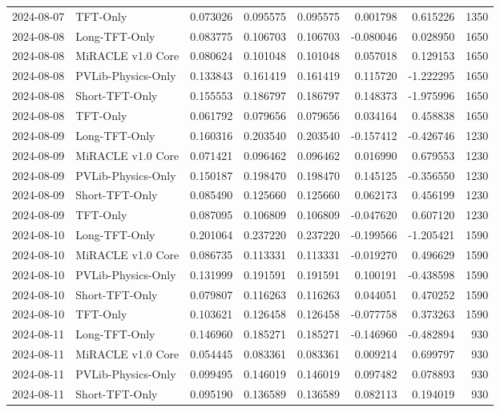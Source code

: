 \begin{tabular}{llrrrrrr}
2024-08-07 & TFT-Only & 0.073026 & 0.095575 & 0.095575 & 0.001798 & 0.615226 & 1350 \\
2024-08-08 & Long-TFT-Only & 0.083775 & 0.106703 & 0.106703 & -0.080046 & 0.028950 & 1650 \\
2024-08-08 & MiRACLE v1.0 Core & 0.080624 & 0.101048 & 0.101048 & 0.057018 & 0.129153 & 1650 \\
2024-08-08 & PVLib-Physics-Only & 0.133843 & 0.161419 & 0.161419 & 0.115720 & -1.222295 & 1650 \\
2024-08-08 & Short-TFT-Only & 0.155553 & 0.186797 & 0.186797 & 0.148373 & -1.975996 & 1650 \\
2024-08-08 & TFT-Only & 0.061792 & 0.079656 & 0.079656 & 0.034164 & 0.458838 & 1650 \\
2024-08-09 & Long-TFT-Only & 0.160316 & 0.203540 & 0.203540 & -0.157412 & -0.426746 & 1230 \\
2024-08-09 & MiRACLE v1.0 Core & 0.071421 & 0.096462 & 0.096462 & 0.016990 & 0.679553 & 1230 \\
2024-08-09 & PVLib-Physics-Only & 0.150187 & 0.198470 & 0.198470 & 0.145125 & -0.356550 & 1230 \\
2024-08-09 & Short-TFT-Only & 0.085490 & 0.125660 & 0.125660 & 0.062173 & 0.456199 & 1230 \\
2024-08-09 & TFT-Only & 0.087095 & 0.106809 & 0.106809 & -0.047620 & 0.607120 & 1230 \\
2024-08-10 & Long-TFT-Only & 0.201064 & 0.237220 & 0.237220 & -0.199566 & -1.205421 & 1590 \\
2024-08-10 & MiRACLE v1.0 Core & 0.086735 & 0.113331 & 0.113331 & -0.019270 & 0.496629 & 1590 \\
2024-08-10 & PVLib-Physics-Only & 0.131999 & 0.191591 & 0.191591 & 0.100191 & -0.438598 & 1590 \\
2024-08-10 & Short-TFT-Only & 0.079807 & 0.116263 & 0.116263 & 0.044051 & 0.470252 & 1590 \\
2024-08-10 & TFT-Only & 0.103621 & 0.126458 & 0.126458 & -0.077758 & 0.373263 & 1590 \\
2024-08-11 & Long-TFT-Only & 0.146960 & 0.185271 & 0.185271 & -0.146960 & -0.482894 & 930 \\
2024-08-11 & MiRACLE v1.0 Core & 0.054445 & 0.083361 & 0.083361 & 0.009214 & 0.699797 & 930 \\
2024-08-11 & PVLib-Physics-Only & 0.099495 & 0.146019 & 0.146019 & 0.097482 & 0.078893 & 930 \\
2024-08-11 & Short-TFT-Only & 0.095190 & 0.136589 & 0.136589 & 0.082113 & 0.194019 & 930 \\

\end{tabular}
